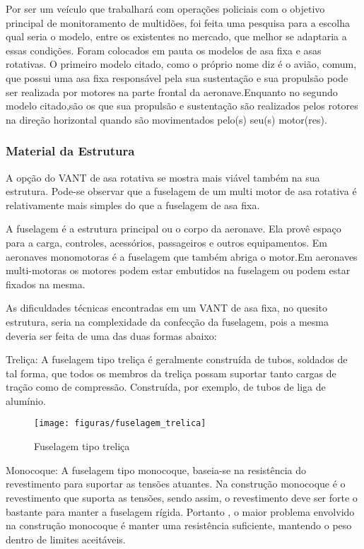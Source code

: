 Por ser um veículo que trabalhará com operações policiais com o objetivo principal de monitoramento de multidões, foi feita uma pesquisa para a escolha qual seria o modelo, entre os existentes no mercado, que melhor se adaptaria a essas condições. Foram colocados em pauta os modelos de asa fixa e asas rotativas. O primeiro modelo citado, como o próprio nome diz é o avião, comum, que possui uma asa fixa responsável pela sua sustentação e sua propulsão pode ser realizada por motores na parte frontal da aeronave.Enquanto no segundo modelo citado,são os que sua propulsão e sustentação são realizados pelos rotores na direção horizontal quando são movimentados pelo(s) seu(s) motor(res).




\subsubsection{Material da Estrutura}

A opção do VANT de asa rotativa se mostra mais viável também na sua estrutura.  Pode-se observar que a fuselagem de um multi motor de asa rotativa é relativamente mais simples do que a fuselagem de asa fixa.

A fuselagem é a estrutura principal ou o corpo da aeronave. Ela provê espaço para a carga, controles, acessórios, passageiros e outros equipamentos. Em aeronaves monomotoras é a fuselagem que também abriga o motor.Em aeronaves multi-motoras os motores podem estar embutidos na fuselagem ou podem estar fixados na mesma.

As dificuldades técnicas encontradas em um VANT de asa fixa, no quesito estrutura, seria na complexidade da confecção da fuselagem, pois a mesma deveria ser feita de uma das duas formas abaixo:

Treliça: A fuselagem tipo treliça é geralmente construída de tubos, soldados de tal forma, que todos os membros da treliça possam suportar tanto cargas de tração como de compressão. Construída, por exemplo, de tubos de liga de alumínio.

\begin{figure}[H]
\centering\texttt{[image: figuras/fuselagem\_trelica]}
\caption{Fuselagem tipo treliça}
\end{figure}

Monocoque: A fuselagem tipo monocoque, baseia-se  na resistência do revestimento para suportar as tensões atuantes.  Na construção monocoque  é o revestimento que suporta as tensões, sendo assim, o revestimento deve ser forte o bastante para manter a fuselagem rígida. Portanto , o maior problema envolvido na construção monocoque é manter uma resistência suficiente, mantendo o peso dentro de limites aceitáveis.

